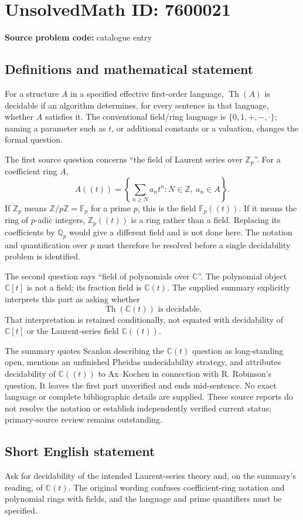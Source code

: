 \documentclass[11pt]{article}
\begin{document}
\section*{UnsolvedMath ID: 7600021}
\textbf{Source problem code:} catalogue entry
\subsection{Definitions and mathematical statement}
For a structure \(A\) in a specified effective first-order language, \(\operatorname{Th}(A)\) is decidable if an algorithm determines, for every sentence in that language, whether \(A\) satisfies it. The conventional field/ring language is \(\{0,1,+,-,\cdot\}\); naming a parameter such as \(t\), or additional constants or a valuation, changes the formal question.

The first source question concerns ``the field of Laurent series over \(\mathbb Z_p\)''. For a coefficient ring \(A\),
\[
 A((t))=\left\{\sum_{n\ge N}a_nt^n:N\in\mathbb Z,\ a_n\in A\right\}.
\]
If \(\mathbb Z_p\) means \(\mathbb Z/p\mathbb Z=\mathbb F_p\) for a prime \(p\), this is the field \(\mathbb F_p((t))\). If it means the ring of \(p\)-adic integers, \(\mathbb Z_p((t))\) is a ring rather than a field. Replacing its coefficients by \(\mathbb Q_p\) would give a different field and is not done here. The notation and quantification over \(p\) must therefore be resolved before a single decidability problem is identified.

The second question says ``field of polynomials over \(\mathbb C\)''. The polynomial object \(\mathbb C[t]\) is not a field; its fraction field is \(\mathbb C(t)\). The supplied summary explicitly interprets this part as asking whether
\[
 \operatorname{Th}(\mathbb C(t))\text{ is decidable}.
\]
That interpretation is retained conditionally, not equated with decidability of \(\mathbb C[t]\) or the Laurent-series field \(\mathbb C((t))\).

The summary quotes Scanlon describing the \(\mathbb C(t)\) question as long-standing open, mentions an unfinished Pheidas undecidability strategy, and attributes decidability of \(\mathbb C((t))\) to Ax--Kochen in connection with R. Robinson's question. It leaves the first part unverified and ends mid-sentence. No exact language or complete bibliographic details are supplied. These source reports do not resolve the notation or establish independently verified current status; primary-source review remains outstanding.
\subsection{Short English statement}
Ask for decidability of the intended Laurent-series theory and, on the summary's reading, of \(\mathbb C(t)\). The original wording confuses coefficient-ring notation and polynomial rings with fields, and the language and prime quantifiers must be specified.
\end{document}
